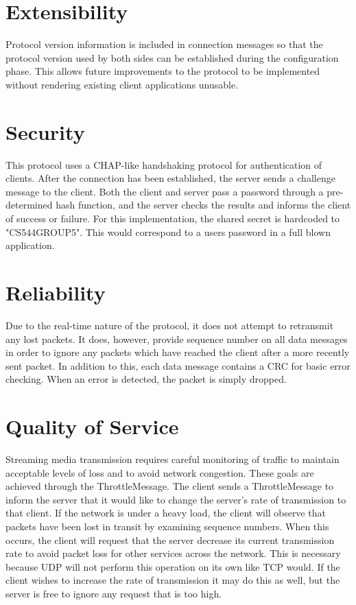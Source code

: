 \documentclass[12pt,letterpaper,titlepage]{article}
\begin{document}


\section{Extensibility}
Protocol version information is included in connection messages so that the protocol version used by both sides can be established during the configuration phase.  This allows future improvements to the protocol to be implemented without rendering existing client applications unusable.

\section{Security}
\label{sec:security}
This protocol uses a CHAP-like handshaking protocol for authentication of clients.  After the connection has been established, the server sends a challenge message to the client.  Both the client and server pass a password through a pre-determined hash function, and the server checks the results and informs the client of success or failure. For this implementation, the shared secret
is hardcoded to "CS544GROUP5". This would correspond to a users password in a full blown
application.

\section{Reliability}
Due to the real-time nature of the protocol, it does not attempt to retransmit any lost packets. It does, however, provide sequence number on all data messages in order to ignore any packets which have reached the client after a more recently sent packet. In addition to this, each data message contains a CRC for basic error checking. When an error is detected, the packet is simply dropped.

\section{Quality of Service}
Streaming media transmission requires careful monitoring of traffic to maintain acceptable levels of loss and to avoid network congestion. These goals are achieved through the ThrottleMessage. The client sends a ThrottleMessage to inform the server that it would like to change the server's rate of transmission to that client. If the network is under a heavy load, the client will observe that packets have been lost in transit by examining sequence numbers. When this occurs, the client will request that the server decrease its current transmission rate to avoid packet loss for other services across the network. This is necessary because UDP will not perform this operation on its own like TCP would. If the client wishes to increase the rate of transmission it may do this as well, but the server is free to ignore any request that is too high.
\end{document}
